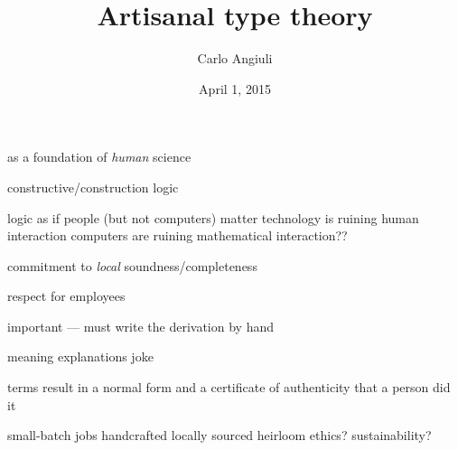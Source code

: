 \documentclass[10pt]{article}
\title{Artisanal type theory}
\author{Carlo Angiuli}
\date{April 1, 2015}
\begin{document}
\maketitle

as a foundation of \emph{human} science

constructive/construction logic

logic as if people (but not computers) matter
technology is ruining human interaction
computers are ruining mathematical interaction??

commitment to \emph{local} soundness/completeness

respect for employees

important --- must write the derivation by hand

meaning explanations joke

terms result in a normal form and a certificate of authenticity that a person did it

small-batch jobs
handcrafted
locally sourced
heirloom
ethics?
sustainability?
\end{document}
